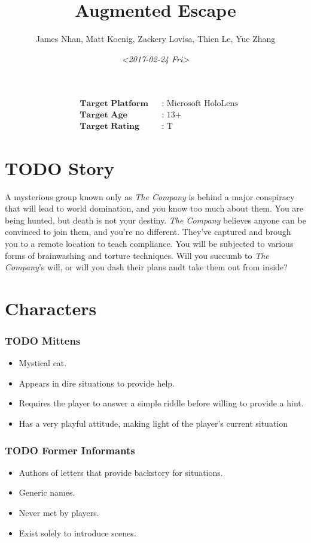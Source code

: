 \documentclass[11pt]{article}
\author{James Nhan, Matt Koenig, Zackery Lovisa, Thien Le, Yue Zhang}
\date{\textit{<2017-02-24 Fri>}}
\title{Augmented Escape}
\begin{document}
\maketitle
\begin{align*}
   &\textbf{Target Platform}&&\text{: Microsoft HoloLens} \\
   &\textbf{Target Age}&&\text{: 13+} \\
   &\textbf{Target Rating}&&\text{: T}
\end{align*}

\pagebreak

\tableofcontents

\pagebreak

\section{{\bfseries\sffamily TODO} Story}
\label{sec:org88abcf5}
A mysterious group known only as \emph{The Company} is behind a major conspiracy that will lead to world domination, and you know too much about them. You are being hunted, but death is not your destiny. \emph{The Company} believes anyone can be convinced to join them, and you're no different. They've captured and brough you to a remote location to teach compliance. You will be subjected to various forms of brainwashing and torture techniques. Will you succumb to \emph{The Company}'s will, or will you dash their plans andt take them out from inside?

\section{Characters}
\label{sec:org44a9989}
\subsubsection{{\bfseries\sffamily TODO} Mittens}
\label{sec:org0b4b4f3}
\begin{itemize}
\item Mystical cat.
\item Appears in dire situations to provide help.
\item Requires the player to answer a simple riddle before willing to provide a hint.
\item Has a very playful attitude, making light of the player's current situation
\end{itemize}

\subsubsection{{\bfseries\sffamily TODO} Former Informants}
\label{sec:org2d79e56}
\begin{itemize}
\item Authors of letters that provide backstory for situations.
\item Generic names.
\item Never met by players.
\item Exist solely to introduce scenes.
\end{itemize}
\end{document}
